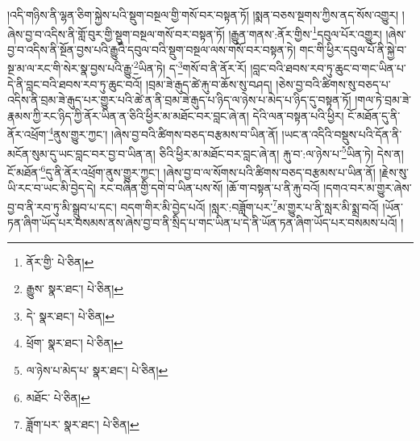 །འདི་གཉིས་ནི་ལྷན་ཅིག་སྐྱེས་པའི་སྡུག་བསྔལ་གྱི་གསོ་བར་བསྟན་ཏོ། །སྨན་བཅས་སྔགས་ཀྱིས་ནད་སོས་འགྱུར། །ཞེས་བྱ་བ་འདིས་ནི་གློ་བུར་གྱི་སྡུག་བསྔལ་གསོ་བར་བསྟན་ཏོ། །རྒྱུན་གནས་:ནོར་གྱིས་\footnote{ནོར་གྱི་  པེ་ཅིན། }དབུལ་པོར་འགྱུར། །ཞེས་བྱ་བ་འདིས་ནི་སྔོན་བྱས་པའི་རྒྱུའི་དབུལ་བའི་སྡུག་བསྔལ་ལས་གསོ་བར་བསྟན་ཏེ། གང་གི་ཕྱིར་དབུལ་པོ་ནི་སྐྱེ་བ་སྔ་མ་ལ་རང་གི་སེར་སྣ་བྱས་པའི་རྒྱུ་\footnote{རྒྱུས་  སྣར་ཐང་།  པེ་ཅིན། }ཡིན་ཏེ། ད་\footnote{དེ་  སྣར་ཐང་།  པེ་ཅིན། }གསོ་བ་ནི་ནོར་རོ། །བླང་བའི་ཐབས་རབ་ཏུ་ཆུང་བ་གང་ཡིན་པ་དེ་ནི་བླང་བའི་ཐབས་རབ་ཏུ་ཆུང་བའོ། །བྲམ་ཟེ་རྒུད་ཚེ་རྐུ་བ་ཆོས་སུ་བཤད། །ཅེས་བྱ་བའི་ཚིགས་སུ་བཅད་པ་འདིས་ནི་བྲམ་ཟེ་རྒུད་པར་གྱུར་པའི་ཚེ་ན་ནི་བྲམ་ཟེ་རྒུད་པ་ཉིད་ལ་ཉེས་པ་མེད་པ་ཉིད་དུ་བསྟན་ཏོ། །གལ་ཏེ་བྲམ་ཟེ་རྣམས་ཀྱི་རང་ཉིད་ཀྱི་ནོར་ཡིན་ན་ཅིའི་ཕྱིར་མ་མཐོང་བར་བླང་ཞེ་ན། དེའི་ལན་བསྟན་པའི་ཕྱིར། ངོ་མཐོན་དུ་ནི་ནོར་འཕྲོག་\footnote{ཕྲོག་  སྣར་ཐང་།  པེ་ཅིན། }ནུས་གྱུར་ཀྱང་། །ཞེས་བྱ་བའི་ཚིགས་བཅད་བརྩམས་བ་ཡིན་ནོ། །ཡང་ན་འདིའི་བསྡུས་པའི་དོན་ནི་མངོན་སུམ་དུ་ཡང་བླང་བར་བྱ་བ་ཡིན་ན། ཅིའི་ཕྱིར་མ་མཐོང་བར་བླང་ཞེ་ན། རྐུ་བ་:ལ་ཉེས་པ་\footnote{ལ་ཉེས་པ་མེད་པ་  སྣར་ཐང་།  པེ་ཅིན། }ཡིན་ཏེ། དེས་ན། ངོ་མཐོན་\footnote{མཐོང་  པེ་ཅིན། }དུ་ནི་ནོར་འཕྲོག་ནུས་གྱུར་ཀྱང་། །ཞེས་བྱ་བ་ལ་སོགས་པའི་ཚིགས་བཅད་བརྩམས་པ་ཡིན་ནོ། །རྗེས་སུ་ཡི་རང་བ་ཡང་མི་བྱེད་དེ། རང་བཞིན་གྱི་དགེ་བ་ཡིན་པས་སོ། །ཆོ་ག་བསྟན་པ་ནི་རྐུ་བའོ། །དགའ་བར་མ་གྱུར་ཞེས་བྱ་བ་ནི་རབ་ཏུ་མི་སྒྲུབ་པ་དང་། བདག་གིར་མི་བྱེད་པའོ། །སླར་:བཟློག་པར་\footnote{ཟློག་པར་  སྣར་ཐང་།  པེ་ཅིན། }མ་གྱུར་པ་ནི་སླར་མི་སྨྲ་བའོ། །ཡོན་ཏན་ཞིག་ཡོད་པར་བསམས་ནས་ཞེས་བྱ་བ་ནི་སྲིད་པ་གང་ཡིན་པ་དེ་ནི་ཡོན་ཏན་ཞིག་ཡོད་པར་བསམས་པའོ། །

